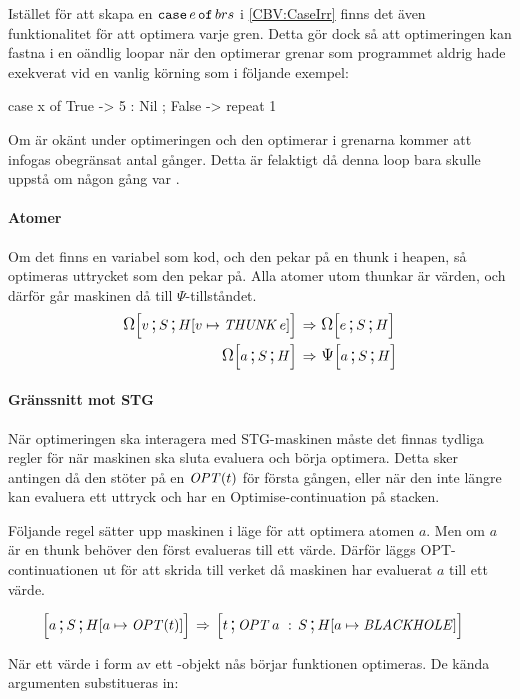 \documentclass[../Optimise]{subfiles}
\begin{document}
Istället för att skapa en $\eCase e brs$ i \eqref{CBV:CaseIrr} finns det även
funktionalitet för att
optimera varje gren. Detta gör dock så att optimeringen kan fastna
i en oändlig loopar när den optimerar grenar som programmet aldrig hade exekverat
vid en vanlig körning som i följande exempel: 

\begin{codeEx}
case x of
    { True  -> 5 : Nil
    ; False -> repeat 1
    }
\end{codeEx}

Om  är okänt under optimeringen och den optimerar i grenarna kommer 
 att infogas obegränsat antal gånger. Detta är felaktigt då denna loop bara skulle uppstå
om  någon gång var .

\paragraph{Atomer}
Om det finns en variabel som kod, och den pekar på en thunk i heapen, så optimeras
uttrycket som den pekar på. Alla atomer utom thunkar är värden, och därför går maskinen
då till $\Psi$-tillståndet.
\begin{align}
\OMEGA S{\heap{v}{\THUNK{e}}}v \rulesep &\, \OMEGA SHe \\
\OMEGA SHa \rulesep &\, \PSI SHa
\end{align}


\paragraph{Gränssnitt mot STG}
När optimeringen ska interagera med STG-maskinen måste det finnas tydliga regler
för när maskinen ska sluta evaluera och börja optimera. Detta sker
antingen då den stöter på en $\OPT t$ för första gången, eller när den
inte längre kan evaluera ett uttryck och har en Optimise-continuation
på stacken.

Följande regel sätter upp maskinen i läge för att optimera atomen $a$. Men om $a$
är en thunk behöver den först evalueras till ett värde. Därför läggs
OPT-continuationen ut för att skrida till verket då maskinen har evaluerat
$a$ till ett värde.

\begin{align}
\mc aS{\heap a{\OPT t}} & \rulesep \mc t{\cOPT{a\,}S}{\heap a{\BH}}
\end{align}

När ett värde i form av ett -objekt nås börjar funktionen optimeras. 
De kända argumenten substitueras in:
\end{document}
